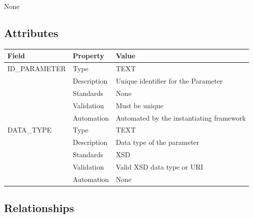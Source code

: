 None

\subsection{Attributes}\label{attributes-18}

\begin{longtable}[]{@{}lll@{}}
\toprule\noalign{}
Field & Property & Value \\
\midrule\noalign{}
\endhead
\bottomrule\noalign{}
\endlastfoot
ID\_PARAMETER & Type & TEXT \\
& Description & Unique identifier for the Parameter \\
& Standards & None \\
& Validation & Must be unique \\
& Automation & Automated by the instantiating framework \\
DATA\_TYPE & Type & TEXT \\
& Description & Data type of the parameter \\
& Standards & XSD \\
& Validation & Valid XSD data type or URI \\
& Automation & None \\
\end{longtable}

\subsection{Relationships}\label{relationships-17}

